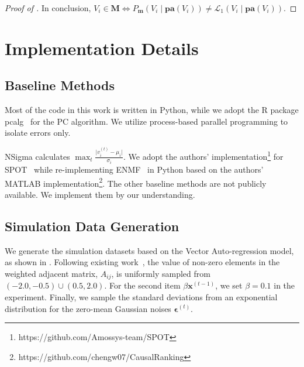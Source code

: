 \begin{proof}[Proof of ]

    In conclusion, $V_{i} \in \mathbf{M} \Leftrightarrow P_{\mathbf{m}}(V_{i} \mid \mathbf{pa}(V_{i})) \neq \mathcal{L}_{1}(V_{i} \mid \mathbf{pa}(V_{i}))$.
\end{proof}

\section{Implementation Details}\label{sec:implementation-details}

\subsection{Baseline Methods}

Most of the code in this work is written in Python, while we adopt the R package pcalg~\cite{Kalisch:2012} for the PC algorithm.
We utilize process-based parallel programming to isolate errors only.

NSigma calculates $\max_{t} \frac{\lvert v_{i}^{(t)} - \mu_{i} \rvert}{\sigma_{i}}$.
We adopt the authors' implementation\footnote{https://github.com/Amossys-team/SPOT} for SPOT~\cite{Siffer:2017} while re-implementing ENMF~\cite{Cheng:2016} in Python based on the authors' MATLAB implementation\footnote{https://github.com/chengw07/CausalRanking}.
The other baseline methods are not publicly available.
We implement them by our understanding.

\subsection{Simulation Data Generation}

We generate the simulation datasets based on the Vector Auto-regression model, as shown in .
Following existing work~\cite{Zheng:2018,He:2021}, the value of non-zero elements in the weighted adjacent matrix, $A_{ij}$, is uniformly sampled from $(-2.0, -0.5) \cup (0.5, 2.0)$.
For the second item $\beta \mathbf{x}^{(t-1)}$, we set $\beta = 0.1$ in the experiment.
Finally, we sample the standard deviations from an exponential distribution for the zero-mean Gaussian noises $\mathbf{\epsilon}^{(t)}$.

